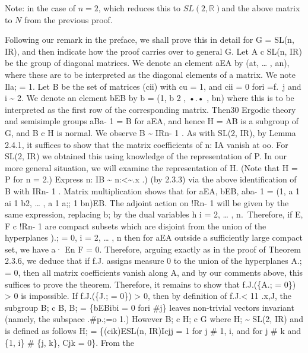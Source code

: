 \documentclass[
  12pt
]{article}
\theoremstyle{break}
\theoremstyle{plain}
\newcommand{\sltr}{\ensuremath{SL(2, \mathbb{R})}}
\begin{document}
  Note: in the case of $n = 2$, which reduces this to \sltr and the above matrix to $N$ from the previous proof.





   Following our remark in the preface, we shall
  prove this in detail for G = SL(n, IR), and then indicate how the proof
  carries over to general G. Let A c SL(n, IR) be the group of diagonal
  matrices. We denote an element aEA by (at, \ldots{} , an), where these
  are to be interpreted as the diagonal elements of a matrix. We note Ila;
  = 1. Let B be the set of matrices (cii) with cu = 1, and cii = 0 fori
  =f.~j and i \textasciitilde{} 2. We denote an element bEB by b = (1, b 2
  , •.• , bn) where this is to be interpreted as the first row of the
  corresponding matrix. Then30 Ergodic theory and semisimple groups aBa- 1
  = B for aEA, and hence H = AB is a subgroup of G, and B c H is normal.
  We observe B \textasciitilde{} IRn- 1 . As with SL(2, IR), by Lemma
  2.4.1, it suffices to show that the matrix coefficients of n: IA vanish
  at oo. For SL(2, IR) we obtained this using knowledge of the
  representation of P. In our more general situation, we will examine the
  representation of H. (Note that H = P for n = 2.) Express n: IB
  \textasciitilde{} n:\textless\textasciitilde.x .) (by 2.3.3) via the
  above identification of B with IRn- 1 . Matrix multiplication shows that
  for aEA, bEB, aba- 1 = (1, a 1 ai 1 b2, \ldots{} , a 1 a;; 1 bn)EB. The
  adjoint action on !Rn- 1 will be given by the same expression, replacing
  b; by the dual variables h i = 2, \ldots{} , n.~Therefore, if E, F c
  !Rn- 1 are compact subsets which are disjoint from the union of the
  hyperplanes ).; = 0, i = 2, \ldots{} , n then for aEA outside a
  sufficiently large compact set, we have a· En F = 0. Therefore, arguing
  exactly as in the proof of Theorem 2.3.6, we deduce that if f.J. assigns
  measure 0 to the union of the hyperplanes A.; = 0, then all matrix
  coefficients vanish along A, and by our comments above, this suffices to
  prove the theorem. Therefore, it remains to show that f.J.(\{A.; = 0\})
  \textgreater{} 0 is impossible. If f.J.(\{J.; = 0\}) \textgreater{} 0,
  then by definition of f.J.\textless{} 11 .x,J, the subgroup B; c B, B; =
  \{bEBibi = 0 fori \#j\} leaves non-trivial vectors invariant (namely,
  the subspace .\#p.;=o 1.) However B; c H; c G where H; \textasciitilde{}
  SL(2, IR) and is defined as follows H; = \{(cik)ESL(n, IR)Icjj = 1 for j
  \# 1, i, and for j \# k and \{1, i\} \# \{j, k\}, Cjk = 0\}. From the
\end{document}
